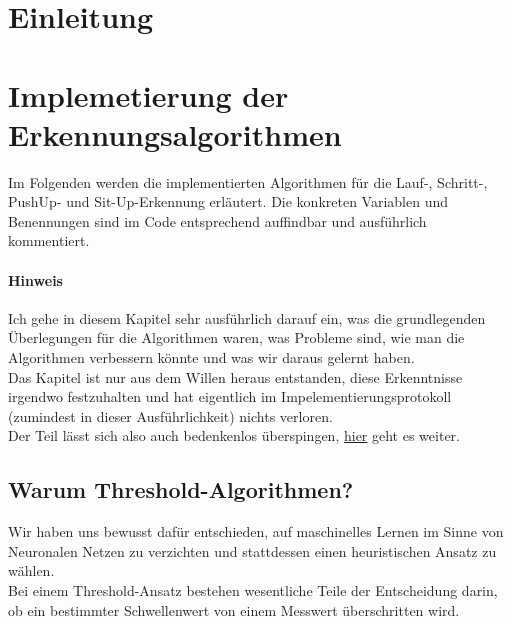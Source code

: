 \documentclass[a4paper,12pt]{article}
\title{\projektName}
\date{\today}
\author{Tec O'Brain}
\begin{document}
\setcounter{page}{2}
\tableofcontents          %
\clearpage
{}

\section{Einleitung}



\section{Implemetierung der Erkennungsalgorithmen}
\label{algorithmen}
Im Folgenden werden die implementierten Algorithmen für die Lauf-, Schritt-, PushUp- und  Sit-Up-Erkennung erläutert. Die konkreten Variablen und Benennungen sind im Code entsprechend auffindbar und ausführlich kommentiert.
\paragraph{Hinweis}

Ich gehe in diesem Kapitel sehr ausführlich darauf ein, was die grundlegenden Überlegungen für die Algorithmen waren, was Probleme sind, wie man die Algorithmen verbessern könnte und was wir daraus gelernt haben.\\
Das Kapitel ist nur aus dem Willen heraus entstanden, diese Erkenntnisse irgendwo festzuhalten und hat eigentlich im Impelementierungsprotokoll (zumindest in dieser Ausführlichkeit) nichts verloren.\\
Der Teil lässt sich also auch bedenkenlos überspingen, \hyperref[aenderungen]{hier} geht es weiter.   
\subsection{Warum Threshold-Algorithmen?}
Wir haben uns bewusst dafür entschieden, auf maschinelles Lernen im Sinne von Neuronalen Netzen zu verzichten und stattdessen einen heuristischen Ansatz zu wählen.\\
 Bei einem Threshold-Ansatz bestehen wesentliche Teile der Entscheidung darin, ob ein bestimmter Schwellenwert von einem Messwert überschritten wird.
\end{document}
